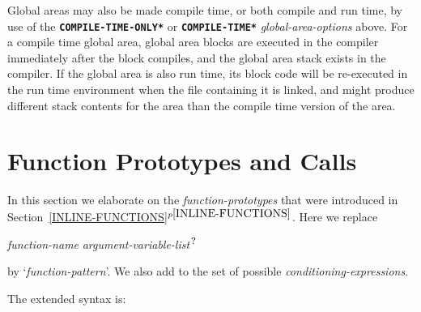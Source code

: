 \documentclass[12pt]{article}
\newcommand{\TT}[1]{{\tt \bfseries #1}}
\newcommand{\itemref}[1]{\ref{#1}$^{p\pageref{#1}}$}
\newcommand{\EOL}{\penalty \exhyphenpenalty}
\newcommand{\QMARK}{{$^{\,\mbox{\footnotesize ?}}$}}
\begin{document}
Global areas may also be made compile time, or both compile and run time,
by use of the \TT{*COM\-PILE-\EOL TIME-\EOL ONLY*} or \TT{*COMPILE-\EOL TIME*}
{\em global-\EOL area-\EOL options} above.  For a compile time
global area, global area blocks are executed in the compiler immediately
after the block compiles, and the global area stack exists in the compiler.
If the global area is also run time, its
block code will be re-executed in the run time environment when the
file containing it is linked, and might produce different stack contents
for the area than the compile time version of the area.

\section{Function Prototypes and Calls}
\label{FUNCTION-PROTOTYPES-AND-CALLS}

In this section we elaborate on the {\em function-prototypes} that were
introduced in Section~\itemref{INLINE-FUNCTIONS}.   Here we replace
\begin{center}
{\em function-name} {\em argument-variable-list}\QMARK{}
\end{center}
by `{\em function-pattern}'.  We also add to the set of possible
{\em conditioning-expressions}.

The extended syntax is:
\end{document}
